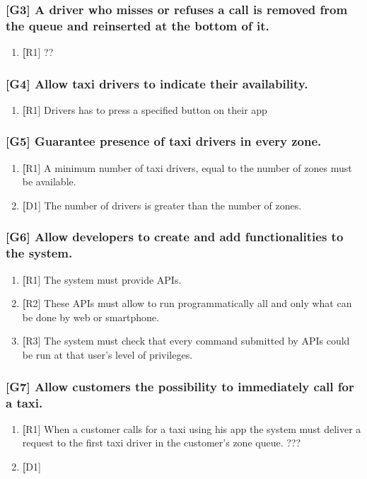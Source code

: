 \subsubsection{[G3] A driver who misses or refuses a call is removed from the queue and reinserted at the bottom of it.}
	\begin{enumerate}
	\item \textbf [R1] ??
	\end{enumerate}
\subsubsection{[G4] Allow taxi drivers to indicate their availability.}
	\begin{enumerate}
	\item \textbf [R1] Drivers has to press a specified button on their app
	\end{enumerate}

\subsubsection{[G5] Guarantee presence of taxi drivers in every zone.}
	\begin{enumerate}
	\item \textbf [R1] A minimum number of taxi drivers, equal to the number of zones must be available.
	\item \textbf [D1] The number of drivers is greater than the number of zones.
	\end{enumerate}
	
\subsubsection{[G6] Allow developers to create and add functionalities to the system.}
	\begin{enumerate}
	\item \textbf [R1] The system must provide APIs.
	\item \textbf [R2] These APIs must allow to run programmatically all and only what can be done by web or smartphone.
	\item \textbf [R3] The system must check that every command submitted by APIs could be run at that user's level of privileges.
	\end{enumerate}
	
\subsubsection{[G7] Allow customers the possibility to immediately call for a taxi.}
	\begin{enumerate}
	\item \textbf [R1] When a customer calls for a taxi using his app the system must deliver a request to the first taxi driver in the customer's zone queue. ???
	\item \textbf [D1] 
	\end{enumerate}

